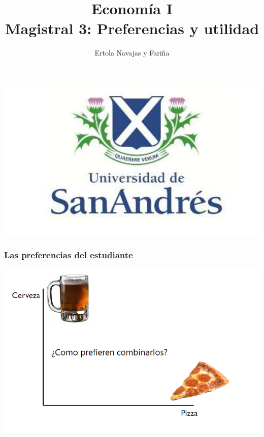 \documentclass{beamer}
\title[Economía I]{Economía I \vspace{4mm}
\\ Magistral 3: Preferencias y utilidad}
\date{}
\author[Ertola Navajas y Fariña]{Ertola Navajas y Fariña}
\institute[]{Universidad de San Andrés}
\begin{document}
\begin{frame}
\titlepage
\centering
\includegraphics[scale=0.2]{Slides Principios de Economia/Figures/logoUDESA.jpg} 
\end{frame}

\begin{frame}
\frametitle{Las preferencias del estudiante}
\centering
\includegraphics[scale=0.55]{Slides Principios de Economia/Figures/Tema_02.11_rp9.png}
\end{frame}
\end{document}
